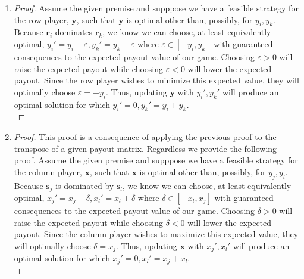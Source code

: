 \documentclass[12pt,oneside]{amsart}
\numberwithin{equation}{section}
\numberwithin{figure}{section}
\theoremstyle{plain}
\theoremstyle{definition}
\begin{document}
\begin{enumerate}
  \item \begin{proof}
    Assume the given premise and supppose we have a feasible strategy for the row 
    player, $\mathbf{y}$, such that $\mathbf{y}$ is optimal other than, possibly,
    for $y_i,y_k$. Because $\mathbf{r}_i$ dominates $\mathbf{r}_k$, we know we 
    can choose, at least equivalently optimal, $y_i' = y_i + \varepsilon,y_k' = 
    y_k - \varepsilon$ where $\varepsilon \in [-y_i,y_k]$ with guaranteed 
    consequences to the expected payout value of our game. Choosing $\varepsilon 
    > 0$ will raise the expected payout while choosing $\varepsilon < 0$ will 
    lower the expected payout. Since the row player wishes to minimize this 
    expected value, they will optimally choose $\varepsilon = -y_i$. Thus, 
    updating $\mathbf{y}$ with $y_i',y_k'$ will produce an optimal solution for 
    which $y_i' = 0,y_k' = y_i + y_k$. \\
    \end{proof}
  \item \begin{proof}
    This proof is a consequence of applying the previous proof to the transpose 
    of a given payout matrix. Regardless we provide the following proof. Assume 
    the given premise and supppose we have a feasible strategy for the column 
    player, $\mathbf{x}$, such that $\mathbf{x}$ is optimal other than, possibly,
    for $y_j,y_l$. Because $\mathbf{s}_j$ is dominated by $\mathbf{s}_l$, we know 
    we can choose, at least equivalently optimal, $x_j' = x_j - \delta,x_l' = x_l 
    + \delta$ where $\delta \in [-x_l,x_j]$ with guaranteed consequences to the 
    expected payout value of our game. Choosing $\delta > 0$ will raise the 
    expected payout while choosing $\delta < 0$ will lower the expected payout. 
    Since the column player wishes to maximize this expected value, they will 
    optimally choose $\delta = x_j$. Thus, updating $\mathbf{x}$ with $x_j',x_l'$ 
    will produce an optimal solution for which $x_j' = 0,x_l' = x_j + x_l$. \\
    \end{proof}


\end{enumerate}
\end{document}

